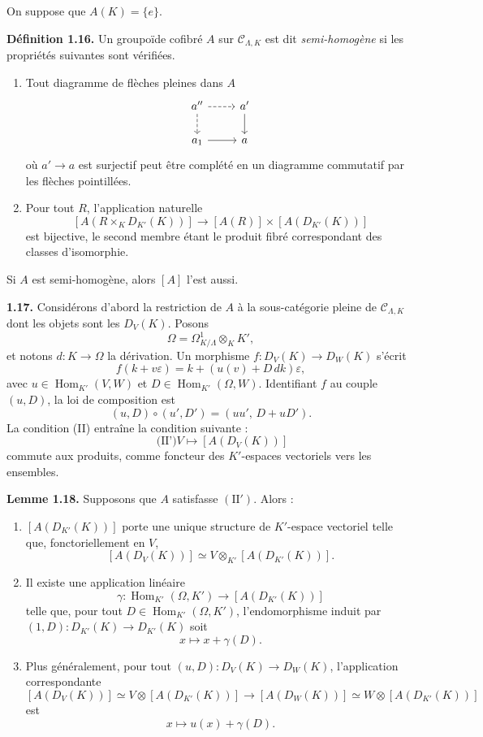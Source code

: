 \documentclass[11pt]{article}
\providecommand{\Hom}{\operatorname{Hom}}
\begin{document}
On suppose que \(A(K)=\{e\}\).

\textbf{D\'efinition 1.16.} Un groupo\"ide cofibr\'e \(A\) sur \(\mathcal C_{\Lambda,K}\)
est dit \emph{semi-homog\`ene} si les propri\'et\'es suivantes sont v\'erifi\'ees.

\begin{enumerate}[label=(\Roman*)]
\item Tout diagramme de fl\`eches pleines dans \(A\)
\[
\begin{tikzcd}
a'' \arrow[r,dashed] \arrow[d,dashed] & a' \arrow[d]\\
a_1 \arrow[r] & a
\end{tikzcd}
\]
o\`u \(a'\to a\) est surjectif peut \^etre compl\'et\'e en un diagramme commutatif
par les fl\`eches pointill\'ees.

\item Pour tout \(R\), l'application naturelle
\[
 [A(R\times_K D_{K'}(K))]
 \longrightarrow
 [A(R)]\times [A(D_{K'}(K))]
\]
est bijective, le second membre \'etant le produit fibr\'e correspondant des classes
d'isomorphie.
\end{enumerate}
Si \(A\) est semi-homog\`ene, alors \([A]\) l'est aussi.

\textbf{1.17.} Consid\'erons d'abord la restriction de \(A\) \`a la sous-cat\'egorie pleine
de \(\mathcal C_{\Lambda,K}\) dont les objets sont les \(D_V(K)\). Posons
\[
 \Omega=\Omega^1_{K/\Lambda}\otimes_K K',
\]
et notons \(d:K\to\Omega\) la d\'erivation. Un morphisme
\(f:D_V(K)\to D_W(K)\) s'\'ecrit
\[
 f(k+v\varepsilon)=k+(u(v)+D\,dk)\varepsilon,
\]
avec \(u\in\Hom_{K'}(V,W)\) et \(D\in\Hom_{K'}(\Omega,W)\). Identifiant \(f\)
au couple \((u,D)\), la loi de composition est
\[
 (u,D)\circ(u',D')=(uu',\,D+uD').
\]
La condition (II) entra\^ine la condition suivante :
\[
\qquad\text{(II')}
 V\longmapsto [A(D_V(K))]
\]
commute aux produits, comme foncteur des \(K'\)-espaces vectoriels vers les ensembles.

\textbf{Lemme 1.18.} Supposons que \(A\) satisfasse \((\mathrm{II}')\). Alors :

\begin{enumerate}[label=(\arabic*)]
\item \([A(D_{K'}(K))]\) porte une unique structure de \(K'\)-espace vectoriel telle que,
fonctoriellement en \(V\),
\[
 [A(D_V(K))]\simeq V\otimes_{K'}[A(D_{K'}(K))].
\]
\item Il existe une application lin\'eaire
\[
 \gamma:\Hom_{K'}(\Omega,K')\longrightarrow [A(D_{K'}(K))]
\]
telle que, pour tout \(D\in\Hom_{K'}(\Omega,K')\), l'endomorphisme induit par
\((1,D):D_{K'}(K)\to D_{K'}(K)\) soit
\[
 x\longmapsto x+\gamma(D).
\]
\item Plus g\'en\'eralement, pour tout \((u,D):D_V(K)\to D_W(K)\), l'application correspondante
\[
 [A(D_V(K))]\simeq V\otimes[A(D_{K'}(K))]
 \longrightarrow
 [A(D_W(K))]\simeq W\otimes[A(D_{K'}(K))]
\]
est
\[
 x\longmapsto u(x)+\gamma(D).
\]
\end{enumerate}
\end{document}
